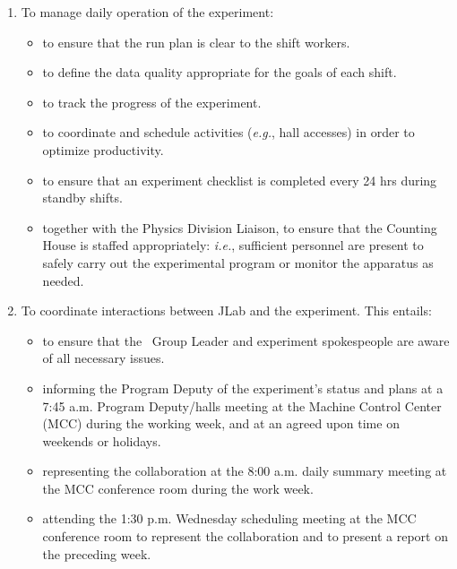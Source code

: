 \documentclass[11pt]{article}
\begin{document}
\begin{enumerate}[label=\Roman*.]
\item To manage daily operation of the experiment:

\begin{itemize}

\item to ensure that the run plan is clear to the shift workers.

\item to define the data quality appropriate for the goals of each shift.

\item to track the progress of the experiment.

\item to coordinate and schedule activities ({\it e.g.},
hall accesses) in order to optimize productivity.

\item to ensure that an experiment checklist is completed every 24 hrs during 
standby shifts.

\item together with the Physics Division Liaison, 
to ensure that the Counting House is staffed appropriately: {\it i.e.},
sufficient personnel are present to safely carry out the experimental 
program or monitor the apparatus as needed.

\end{itemize}



\item To coordinate interactions between JLab and the experiment. This
 entails:

\begin{itemize}

\item to ensure that the \HALL\ Group Leader and experiment
spokespeople are aware of all necessary issues.

\item informing the Program Deputy of the experiment's status and plans at 
a 7:45 a.m. Program Deputy/halls meeting at the Machine Control Center (MCC) during the working week, and at an agreed
upon time on weekends or holidays.

\item representing the collaboration at the 8:00 a.m. daily summary meeting at the MCC conference 
room during the work week. 

\item attending the 1:30 p.m. Wednesday scheduling meeting at the MCC conference 
room to represent the collaboration and to present a report on the
preceding week.


\end{itemize}
\end{enumerate}
\end{document}
